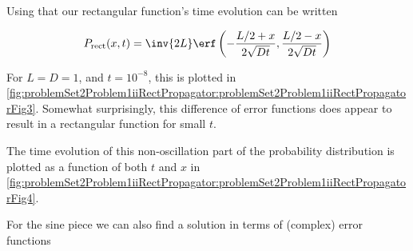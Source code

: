 {Using that our rectangular function's time evolution can be written

\begin{dmath}\label{eqn:basicStatMechProblemSet2Problem1:500}
P_{\mathrm{rect}}(x, t)
=
\inv{2 L} \erf
\left( 
-\frac{L/2 +x}{2 \sqrt{D t}} 
,
\frac{L/2 -x}{2 \sqrt{D t}} 
\right)
\end{dmath}

For $L = D = 1$, and $t = 10^{-8}$, this is plotted in \cref{fig:problemSet2Problem1iiRectPropagator:problemSet2Problem1iiRectPropagatorFig3}.  Somewhat surprisingly, this difference of error functions does appear to result in a rectangular function for small $t$.


The time evolution of this non-oscillation part of the probability distribution is plotted as a function of both $t$ and $x$ in \cref{fig:problemSet2Problem1iiRectPropagator:problemSet2Problem1iiRectPropagatorFig4}.


For the sine piece we can also find a solution in terms of (complex) error functions

}
